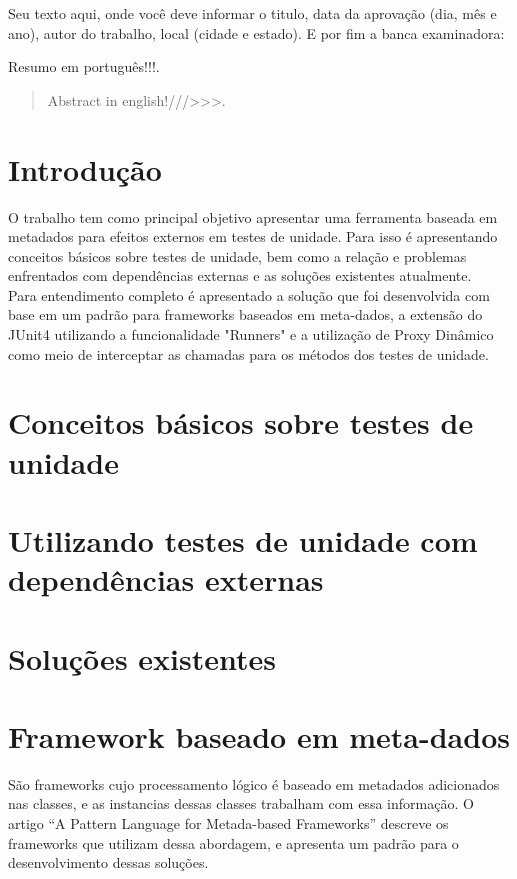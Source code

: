 \documentclass{abnt}
\begin{document}
\capa
\folhaderosto

\setlength{\ABNTsignthickness}{1pt}
\begin{folhadeaprovacao}
	Seu texto aqui, onde você deve informar o titulo, data da aprovação (dia, mês e ano), autor do trabalho, local (cidade e estado). E por fim a banca examinadora:
\end{folhadeaprovacao}

\begin{resumo}
	Resumo em português!!!.
\end{resumo}

\begin{abstract}
	Abstract in english!///>>>.
\end{abstract}
\sumario
\chapter{Introdução} 
O trabalho tem como principal objetivo apresentar uma ferramenta baseada em metadados para efeitos externos em testes de unidade. Para isso é apresentando conceitos básicos sobre testes de unidade, bem como a relação e problemas enfrentados com dependências externas e as soluções existentes atualmente.\\
Para entendimento completo é apresentado a solução que foi desenvolvida com base em um padrão para frameworks baseados em meta-dados, a extensão do JUnit4 utilizando a funcionalidade "Runners" e a utilização de Proxy Dinâmico como meio de interceptar as chamadas para os métodos dos testes de unidade.\\
\chapter{Conceitos básicos sobre testes de unidade}
\chapter{Utilizando testes de unidade com dependências externas} 
\chapter{Soluções existentes}
\chapter{Framework baseado em meta-dados}
São frameworks cujo processamento lógico é baseado em metadados adicionados nas classes, e as instancias dessas classes trabalham com essa informação. O artigo ``A Pattern Language for Metada-based Frameworks'' \cite{GUERRA-PATTERN} descreve os frameworks que utilizam dessa abordagem, e apresenta um padrão para o desenvolvimento dessas soluções.\\
\end{document}
